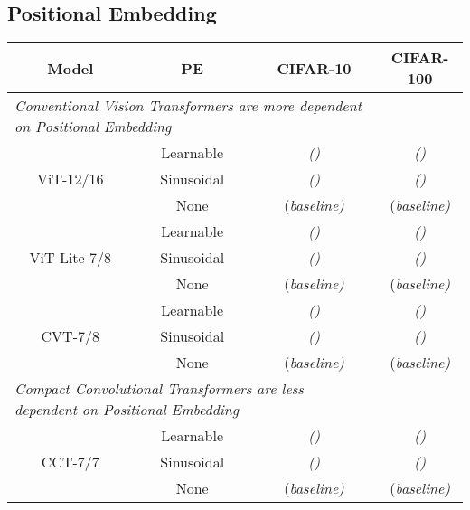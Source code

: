 \documentclass[10pt,twocolumn,letterpaper]{article}
\begin{document}
\subsection{Positional Embedding}
\label{sec:pe}
\begin{table*}[t]
    \centering
    \begin{tabular}{cc|cc}
        \toprule
        Model & PE & CIFAR-10 & CIFAR-100\\
        \midrule
        \multicolumn{3}{l}{\textit{Conventional Vision Transformers are more dependent on Positional Embedding }}\\
        \midrule
        
        \multirow{3}{*}{ViT-12/16} & Learnable &  {\color{red}\small \textit{()}} &  {\color{red}\small \textit{()}} \\
        & Sinusoidal &  {\color{red}\small \textit{()}} &  {\color{blue}\small \textit{()}}\\
        & None &  {\color{black}(\small \textit{baseline)}} &  {\color{black}(\small \textit{baseline)}}\\
        
        \midrule
        
        \multirow{3}{*}{ViT-Lite-7/8} & Learnable &  {\color{red}\small \textit{()}} &  {\color{red}\small \textit{()}} \\
        & Sinusoidal &  {\color{red}\small \textit{()}} &  {\color{red}\small \textit{()}} \\
        & None &  {\color{black}(\small \textit{baseline)}} &  {\color{black}(\small \textit{baseline)}} \\
        
        \midrule
        
        \multirow{3}{*}{CVT-7/8} & Learnable &  {\color{red}\small \textit{()}} &  {\color{red}\small \textit{()}} \\
        & Sinusoidal &  {\color{red}\small \textit{()}} &  {\color{red}\small \textit{()}} \\
        & None &  {\color{black}(\small \textit{baseline)}} &  {\color{black}(\small \textit{baseline)}} \\
        
        \midrule
        \multicolumn{3}{l}{\textit{Compact Convolutional Transformers are less dependent on Positional Embedding }}\\
        \midrule
        
        \multirow{3}{*}{CCT-7/7} & Learnable &  {\color{red}\small \textit{()}} &  {\color{red}\small \textit{()}} \\
        & Sinusoidal &  {\color{blue}\small \textit{()}} &  {\color{red}\small \textit{()}} \\
        & None &  {\color{black}(\small \textit{baseline)}} &  {\color{black}(\small \textit{baseline)}} \\
        

\end{tabular}
\end{table*}
\end{document}
